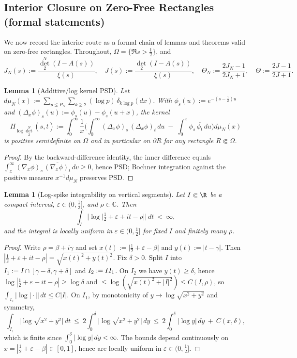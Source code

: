 \documentclass[11pt]{article}
\newtheorem{lemma}[theorem]{Lemma}
\theoremstyle{remark}
\newcommand{\C}{\mathbb{C}}
\begin{document}
\subsection*{Interior Closure on Zero-Free Rectangles (formal statements)}
We now record the interior route as a formal chain of lemmas and theorems valid on zero-free rectangles. Throughout, \(\Omega=\{\Re s>\tfrac12\}\), and
\[J_N(s):=\frac{\det_2^N(I-A(s))}{\xi(s)},\quad J(s):=\frac{\det_2(I-A(s))}{\xi(s)},\quad \Theta_N:=\frac{2J_N-1}{2J_N+1},\quad \Theta:=\frac{2J-1}{2J+1}.
\]

\begin{lemma}[Additive/log kernel PSD]\label{lem:log-psd-formal}
Let \(d\mu_N(x):=\sum_{p\le P_N}\sum_{k\ge2}(\log p)\,\delta_{k\log p}(dx)\). With \(\phi_s(u):=e^{-(s-\frac12)u}\) and \((\Delta_x\phi)_s(u):=\phi_s(u)-\phi_s(u+x)\), the kernel
\[H_{\log\det_2^N}(s,\overline t):=\int_0^\infty \frac{1}{x}\Big(\int_0^\infty (\Delta_x\phi)_s\,\overline{(\Delta_x\phi)_t}\,du\; -\; \int_0^x \phi_s\,\overline{\phi_t}\,du\Big)d\mu_N(x)
\]
is positive semidefinite on \(\Omega\) and in particular on \(\partial R\) for any rectangle \(R\Subset\Omega\).
\end{lemma}
\begin{proof}
By the backward-difference identity, the inner difference equals \(\int_x^\infty (\nabla_x\phi)_s\,\overline{(\nabla_x\phi)_t}\,dv\ge0\), hence PSD; Bochner integration against the positive measure \(x^{-1}d\mu_N\) preserves PSD.
\end{proof}

\begin{lemma}[Log-spike integrability on vertical segments]\label{lem:log-spike-int}
Let $I\Subset\R$ be a compact interval, $\varepsilon\in(0,\tfrac12]$, and $\rho\in\C$. Then
\[
 \int_I \big|\log\big|\tfrac12+\varepsilon+it-\rho\big|\big|\,dt\ <\ \infty,
\]
and the integral is locally uniform in $\varepsilon\in(0,\tfrac12]$ for fixed $I$ and finitely many $\rho$.
\end{lemma}
\begin{proof}
Write $\rho=\beta+i\gamma$ and set $x(t):=\big|\tfrac12+\varepsilon-\beta\big|$ and $y(t):=|t-\gamma|$. Then $|\tfrac12+\varepsilon+it-\rho|=\sqrt{x(t)^2+y(t)^2}$. Fix $\delta>0$. Split $I$ into $I_1:=I\cap[\gamma-\delta,\gamma+\delta]$ and $I_2:=I\\I_1$. On $I_2$ we have $y(t)\ge \delta$, hence $\log|\tfrac12+\varepsilon+it-\rho|\ge \log\delta$ and $\le \log(\sqrt{x(t)^2+|I|^2})\le C(I,\rho)$, so $\int_{I_2}|\log|\cdot||\,dt\le C|I|$. On $I_1$, by monotonicity of $y\mapsto \log\sqrt{x^2+y^2}$ and symmetry,
\[
 \int_{I_1}\!\big|\log\sqrt{x^2+y^2}\big|\,dt\ \le\ 2\int_0^{\delta} \big|\log\sqrt{x^2+y^2}\big|\,dy\ \le\ 2\int_0^{\delta} \big|\log y\big|\,dy\ +\ C(x,\delta),
\]
which is finite since $\int_0^{\delta}|\log y|\,dy<\infty$. The bounds depend continuously on $x=|\tfrac12+\varepsilon-\beta|\in[0,1]$, hence are locally uniform in $\varepsilon\in(0,\tfrac12]$.
\end{proof}
\end{document}
